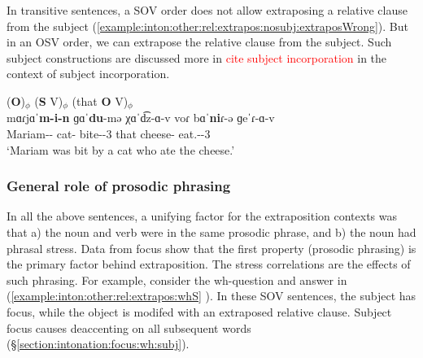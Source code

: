 In transitive sentences, a SOV order does not allow extraposing a  relative clause from the subject (\ref{example:inton:other:rel:extrapos:nosubj:extraposWrong}). But in an OSV order, we can extrapose the relative clause from the subject. Such subject constructions are discussed more in \textcolor{red}{cite subject incorporation} in the context of subject incorporation.  


\begin{exe}
	\ex \glll   ({{\textbf{O}}})$_\phi$   (\textbf{S} V)$_\phi$  (that {\textbf{O}} V)$_\phi$\\
	mɑɾjɑˈ\textbf{m-i-n} {{ɡɑˈ\textbf{du}-mə}}   χɑˈd͡z-ɑ-v voɾ   {{bɑˈ\textbf{ni}ɾ-ə}} {ɡeˈɾ-ɑ-v} 
	\\
	Mariam-{\dat}-{} cat-{\indf}   bite-{\pst}-3{\sg} that   cheese-{} eat.{\aorperf}-{\pst}-3{\sg} 
	\\
	\trans   `Mariam was bit by a cat who ate the cheese.' 
	\label{example:inton:other:rel:extrapos:OSV}
	\\
	
\end{exe} 

\subsubsection{General role of prosodic phrasing}\label{section:intonation:other:extraposition:gen}

In all the above sentences, a unifying factor for the extraposition contexts was that a) the noun and verb were in the same prosodic phrase, and b) the noun had phrasal stress. Data from focus show that  the first property (prosodic phrasing) is the primary factor behind extraposition. The stress correlations are the effects of such phrasing. For example, consider the wh-question and answer in (\ref{example:inton:other:rel:extrapos:whS} ). In these SOV sentences, the subject has focus, while the object is modifed with an extraposed relative clause. Subject focus causes deaccenting on all subsequent words (\S\ref{section:intonation:focus:wh:subj}).


